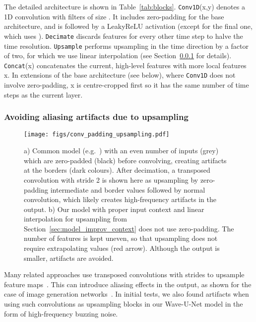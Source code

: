 \documentclass{article}
\begin{document}
The detailed architecture is shown in Table~\ref{tab:blocks}.
\texttt{Conv1D}(x,y) denotes a 1D convolution with  filters of size .
It includes zero-padding for the base architecture, and is followed by a LeakyReLU activation (except for the final one, which uses ).
\texttt{Decimate} discards features for every other time step to halve the time resolution.
\texttt{Upsample} performs upsampling in the time direction by a factor of two, for which we use linear interpolation (see Section~\ref{sec:model_artifacts} for details).
\texttt{Concat}(x) concatenates the current, high-level features with more local features x.
In extensions of the base architecture (see below), where \texttt{Conv1D} does not involve zero-padding, x is centre-cropped first so it has the same number of time steps as the current layer.

\subsubsection{Avoiding aliasing artifacts due to upsampling}
\label{sec:model_artifacts}

\begin{figure}[t]
\centering
\centerline{\texttt{[image: figs/conv\_padding\_upsampling.pdf]}}
\caption{a) Common model (e.g.~\cite{Jansson2017}) with an even number of inputs (grey) which are zero-padded (black) before convolving, creating artifacts at the borders (dark colours). After decimation, a transposed convolution with stride 2 is shown here as upsampling by zero-padding intermediate and border values followed by normal convolution, which likely creates high-frequency artifacts in the output. b) Our model with proper input context and linear interpolation for upsampling from Section~\ref{sec:model_improv_context} does not use zero-padding. The number of features is kept uneven, so that upsampling does not require extrapolating values (red arrow). Although the output is smaller, artifacts are avoided.}
\label{fig:convpaddingupsampling}
\end{figure}

Many related approaches use transposed convolutions with strides to upsample feature maps~\cite{Pascual2017,Jansson2017}.
This can introduce aliasing effects in the output, as shown for the case of image generation networks~\cite{Odena2016}.
In initial tests, we also found artifacts when using such convolutions as upsampling blocks in our Wave-U-Net model in the form of high-frequency buzzing noise.
\end{document}
